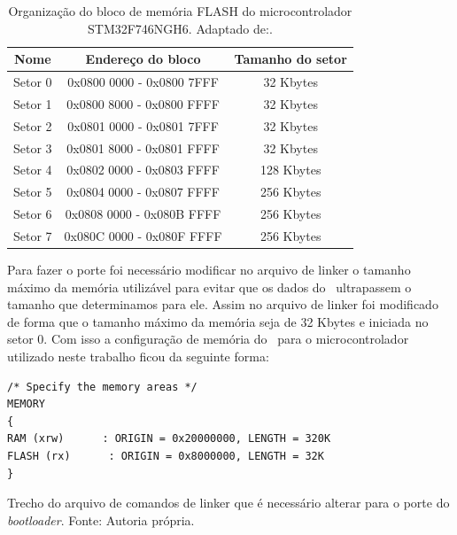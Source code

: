 \begin{table}[H]
    \scriptsize
    \centering
    \begin{tabular}{|c|c|c|}

    \hline
    Nome    & Endereço do bloco         & Tamanho do setor \\ \hline
    Setor 0 & 0x0800 0000 - 0x0800 7FFF & 32 Kbytes        \\ \hline
    Setor 1 & 0x0800 8000 - 0x0800 FFFF & 32 Kbytes        \\ \hline
    Setor 2 & 0x0801 0000 - 0x0801 7FFF & 32 Kbytes        \\ \hline
    Setor 3 & 0x0801 8000 - 0x0801 FFFF & 32 Kbytes        \\ \hline
    Setor 4 & 0x0802 0000 - 0x0803 FFFF & 128 Kbytes       \\ \hline
    Setor 5 & 0x0804 0000 - 0x0807 FFFF & 256 Kbytes       \\ \hline
    Setor 6 & 0x0808 0000 - 0x080B FFFF & 256 Kbytes       \\ \hline
    Setor 7 & 0x080C 0000 - 0x080F FFFF & 256 Kbytes       \\ \hline
    \end{tabular}
    \caption{Organização do bloco de memória FLASH do microcontrolador STM32F746NGH6. \newline Adaptado de:\cite{STM32F7}.}
    \label{STM32F7_FLASH}
    \end{table}


Para fazer o porte foi necessário modificar no arquivo de linker o tamanho máximo da memória utilizável para evitar que os dados do \bootloader\ ultrapassem o tamanho que determinamos para ele. Assim no arquivo de linker foi modificado de forma que o tamanho máximo da memória seja de 32 Kbytes e iniciada no setor 0. Com isso a configuração de memória do \bootloader\ para o microcontrolador utilizado neste trabalho ficou da seguinte forma:


\begin{algorithm}[H]
\begin{lstlisting}
/* Specify the memory areas */
MEMORY
{
RAM (xrw)      : ORIGIN = 0x20000000, LENGTH = 320K
FLASH (rx)      : ORIGIN = 0x8000000, LENGTH = 32K
}

\end{lstlisting}
\caption{Trecho do arquivo de comandos de linker que é necessário alterar para o porte do \textit{bootloader}.
\newline Fonte: Autoria própria.}
\end{algorithm}

